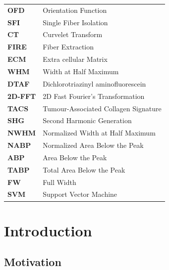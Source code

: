 \documentclass[12pt,a4paper]{article}
\begin{document}
\begin{table}[H]
\begin{center}


\begin{tabular}{ l l }

 \textbf{ OFD } &  Orientation Function  \\
 \textbf{ SFI  } &Single Fiber Isolation  \\
 \textbf{ CT }    & Curvelet Transform  \\
 \textbf{ FIRE  } & Fiber Extraction  \\
 \textbf{ ECM  }  & Extra cellular Matrix  \\
 \textbf{ WHM   } & Width at Half Maximum  \\
 \textbf{ DTAF    } & Dichlorotriazinyl aminoﬂuorescein  \\
 \textbf{ 2D-FFT     } & 2D Fast Fourier’s Transformation  \\
 \textbf{ TACS     } &  Tumour-Associated Collagen Signature  \\
 \textbf{ SHG     } &  Second Harmonic Generation  \\
 \textbf{ NWHM     } &  Normalized Width at Half Maximum  \\
 \textbf{ NABP     } &   Normalized Area Below the Peak \\
 \textbf{ ABP     } &    Area Below the Peak \\
 \textbf{ TABP     } &   Total Area Below the Peak \\
 \textbf{ FW     } &   Full Width \\
 \textbf{ SVM     } &  Support Vector Machine \\
 
\end{tabular}
\end{center}
\end{table}

\thispagestyle{empty}
\newpage





\section{Introduction}

\subsection{Motivation}
\end{document}
